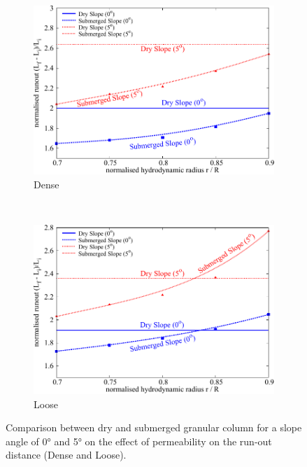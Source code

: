 \begin{figure}[!ht]
	\centering
\begin{subfigure}[b]{0.85\textwidth}
	\centering
    \includegraphics[width=\textwidth]{Perm_Runout_a08_dense}
    \caption{Dense}
    \label{fig:Perm_Runout_a08_dense}
\end{subfigure}\\
\begin{subfigure}[b]{0.85\textwidth}
	\centering
    \includegraphics[width=\textwidth]{Perm_Runout_a08_loose}
    \caption{Loose}
    \label{fig:Perm_Runout_a08_loose}
\end{subfigure}
\caption{Comparison between dry and submerged granular column for a slope angle 
of 0\si{\degree} and 5\si{\degree} on the effect of permeability on the run-out 
distance (Dense and Loose).}
\label{fig:Perm_Runout_loose_dense}
\end{figure}

